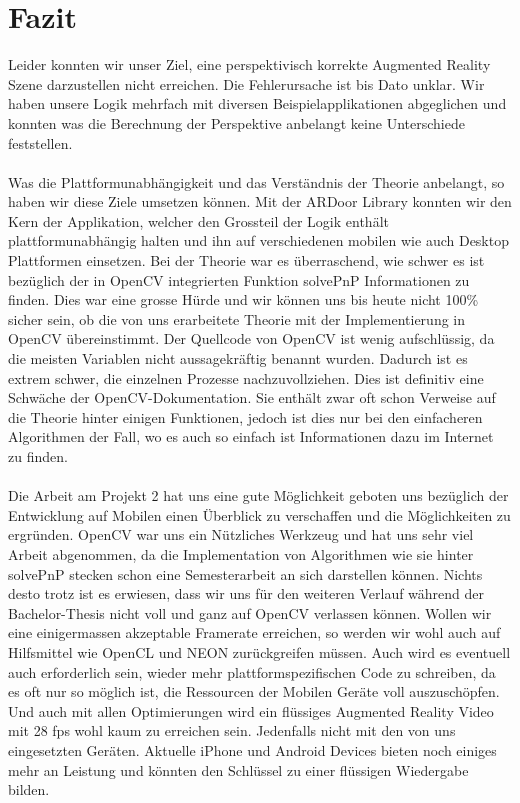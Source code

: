 \documentclass[main.tex]{subfiles}
\begin{document}
\section{Fazit}

Leider konnten wir unser Ziel, eine perspektivisch korrekte Augmented Reality Szene darzustellen nicht erreichen. Die Fehlerursache ist bis Dato unklar. Wir haben unsere Logik mehrfach mit diversen Beispielapplikationen abgeglichen und konnten was die Berechnung der Perspektive anbelangt keine Unterschiede feststellen. 
\paragraph{}
Was die Plattformunabhängigkeit und das Verständnis der Theorie anbelangt, so haben wir diese Ziele umsetzen können. Mit der ARDoor Library konnten wir den Kern der Applikation, welcher den Grossteil der Logik enthält plattformunabhängig halten und ihn auf verschiedenen mobilen wie auch Desktop Plattformen einsetzen. Bei der Theorie war es überraschend, wie schwer es ist bezüglich der in OpenCV integrierten Funktion solvePnP Informationen zu finden. Dies war eine grosse Hürde und wir können uns bis heute nicht 100\% sicher sein, ob die von uns erarbeitete Theorie mit der Implementierung in OpenCV übereinstimmt. Der Quellcode von OpenCV ist wenig aufschlüssig, da die meisten Variablen nicht aussagekräftig benannt wurden. Dadurch ist es extrem schwer, die einzelnen Prozesse nachzuvollziehen. Dies ist definitiv eine Schwäche der OpenCV-Dokumentation. Sie enthält zwar oft schon Verweise auf die Theorie hinter einigen Funktionen, jedoch ist dies nur bei den einfacheren Algorithmen der Fall, wo es auch so einfach ist Informationen dazu im Internet zu finden.
\paragraph{}
Die Arbeit am Projekt 2 hat uns eine gute Möglichkeit geboten uns bezüglich der Entwicklung auf Mobilen einen Überblick zu verschaffen und die Möglichkeiten zu ergründen. OpenCV war uns ein Nützliches Werkzeug und hat uns sehr viel Arbeit abgenommen, da die Implementation von Algorithmen wie sie hinter solvePnP stecken schon eine Semesterarbeit an sich darstellen können. Nichts desto trotz ist es erwiesen, dass wir uns für den weiteren Verlauf während der Bachelor-Thesis nicht voll und ganz auf OpenCV verlassen können. Wollen wir eine einigermassen akzeptable Framerate erreichen, so werden wir wohl auch auf Hilfsmittel wie OpenCL und NEON zurückgreifen müssen. Auch wird es eventuell auch erforderlich sein, wieder mehr plattformspezifischen Code zu schreiben, da es oft nur so möglich ist, die Ressourcen der Mobilen Geräte voll auszuschöpfen. Und auch mit allen Optimierungen wird ein flüssiges Augmented Reality Video mit 28 fps wohl kaum zu erreichen sein. Jedenfalls nicht mit den von uns eingesetzten Geräten. Aktuelle iPhone und Android Devices bieten noch einiges mehr an Leistung und könnten den Schlüssel zu einer flüssigen Wiedergabe bilden.
\end{document}
